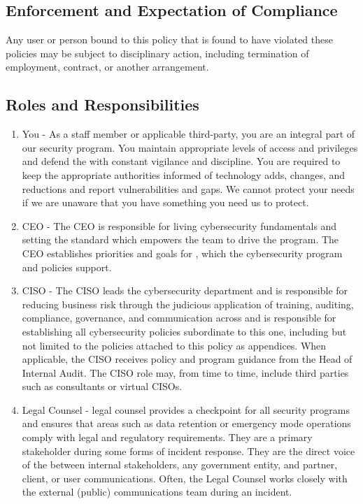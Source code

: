 \documentclass[../main.tex]{subfiles}
\begin{document}
  \subsection{Enforcement and Expectation of Compliance}
    Any user or person bound to this policy that is found to have violated these policies may be subject to disciplinary action, including termination of employment, contract, or another arrangement.
  \subsection{Roles and Responsibilities}
  \begin{enumerate}
    \item You - As a \CompanyName staff member or applicable third-party, you are an integral part of our security program. You maintain appropriate levels of access and privileges and defend
    the \CompanyName with constant vigilance and discipline. You are required to keep the appropriate authorities informed of technology adds, changes, and reductions and report vulnerabilities
    and gaps. We cannot protect your needs if we are unaware that you have something you need us to protect.
    \item CEO - The CEO is responsible for living cybersecurity fundamentals and setting the standard which empowers the team to drive the program. The CEO establishes priorities and goals
    for \CompanyName, which the cybersecurity program and policies support.
    \item CISO - The CISO leads the cybersecurity department and is responsible for reducing business risk through the judicious application of training, auditing, compliance, governance,
    and communication across \CompanyName and is responsible for establishing all cybersecurity policies subordinate to this one, including but not limited to the policies attached to this
    policy as appendices. When applicable, the CISO receives policy and program guidance from the Head of Internal Audit. The CISO role may, from time to time, include third parties such as
    consultants or virtual CISOs.
    \item Legal Counsel - \CompanyName legal counsel provides a checkpoint for all security programs and ensures that areas such as data retention or emergency mode operations comply with legal
    and regulatory requirements. They are a primary stakeholder during some forms of incident response. They are the direct voice of the \CompanyName between internal stakeholders, any government
    entity, and partner, client, or user communications. Often, the Legal Counsel works closely with the external (public) communications team during an incident.

\end{enumerate}
\end{document}
